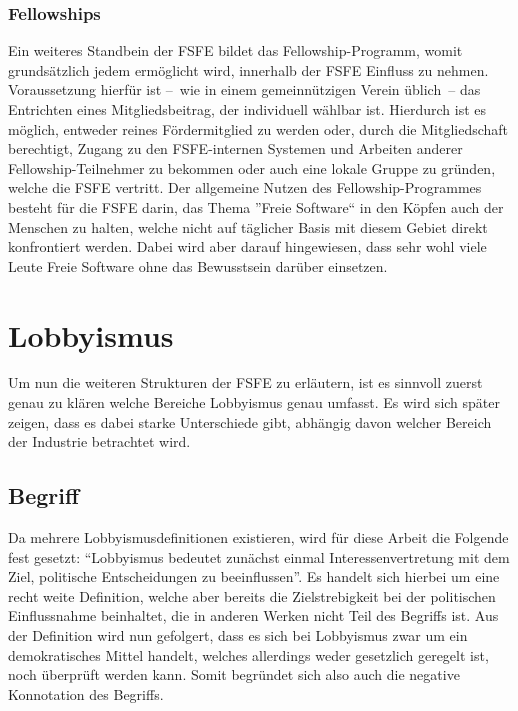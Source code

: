 \subsubsection{Fellowships}
Ein weiteres Standbein der FSFE bildet das Fellowship-Programm, womit
grundsätzlich jedem ermöglicht wird, innerhalb der FSFE Einfluss zu nehmen.
Voraussetzung hierfür ist --~wie in einem gemeinnützigen Verein üblich~-- das 
Entrichten eines Mitgliedsbeitrag, der individuell
wählbar ist. Hierdurch ist es möglich, entweder reines Fördermitglied zu werden
oder, durch die Mitgliedschaft berechtigt, Zugang zu den FSFE-internen Systemen 
und Arbeiten anderer Fellowship-Teilnehmer zu bekommen oder auch eine lokale 
Gruppe
zu gründen, welche die FSFE vertritt. Der allgemeine Nutzen des 
Fellowship-Programmes besteht für die FSFE darin, das Thema ''Freie Software`` 
in 
den Köpfen auch der Menschen zu halten, welche nicht auf täglicher Basis mit 
diesem Gebiet direkt konfrontiert werden. Dabei wird aber darauf hingewiesen, 
dass sehr wohl viele Leute Freie Software ohne das Bewusstsein darüber 
einsetzen.
\cite{PLGreveInterView}

\newpage
\section{Lobbyismus}
Um nun die weiteren Strukturen der FSFE zu erläutern, ist es sinnvoll zuerst 
genau zu klären welche Bereiche Lobbyismus genau umfasst. Es wird sich später 
zeigen, dass es dabei starke Unterschiede gibt, abhängig davon welcher Bereich 
der Industrie betrachtet wird.

\subsection{Begriff}
Da mehrere Lobbyismusdefinitionen existieren, wird für diese Arbeit die Folgende
fest gesetzt: ``Lobbyismus bedeutet zunächst einmal Interessenvertretung mit 
dem Ziel, politische Entscheidungen zu beeinflussen''. \cite{LeifSpeth200312} 
Es 
handelt sich hierbei um eine recht weite Definition, welche aber bereits die 
Zielstrebigkeit bei der politischen Einflussnahme beinhaltet, die in anderen 
Werken nicht Teil des Begriffs ist. Aus der Definition wird nun gefolgert, dass
es sich bei Lobbyismus zwar um ein demokratisches Mittel handelt, welches 
allerdings weder gesetzlich geregelt ist, noch überprüft werden kann. Somit 
begründet sich also auch die negative Konnotation des Begriffs.

